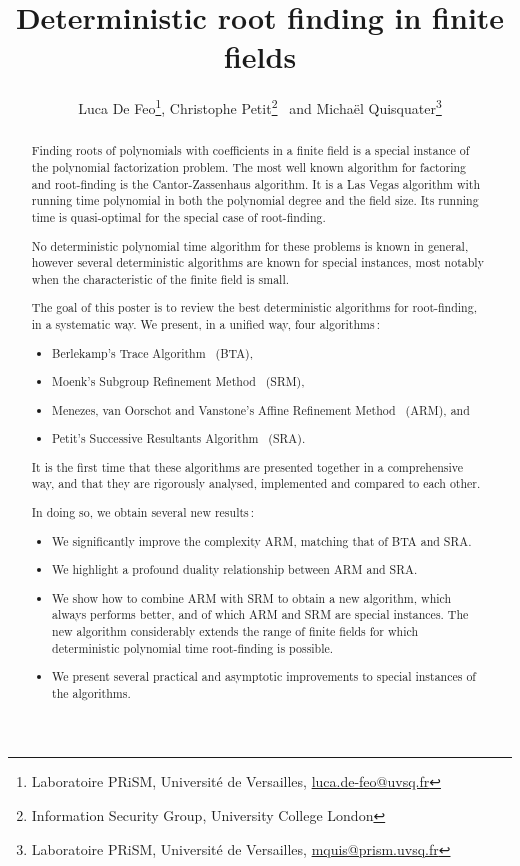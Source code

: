 \documentclass[11pt]{article}
\newcounter{algo}
\begin{document}
\title{Deterministic root finding in finite fields}

\author{
  Luca De Feo\footnote{
    Laboratoire PRiSM,
    Universit\'e de Versailles,
    \url{luca.de-feo@uvsq.fr}},
  Christophe Petit\footnote{
    Information Security Group,
    University College London}~ and
  Micha\"el Quisquater\footnote{
    Laboratoire PRiSM,
    Universit\'e de Versailles,
    \url{mquis@prism.uvsq.fr}}
}

\maketitle
\begin{abstract}
  Finding roots of polynomials with coefficients in a finite field is
  a special instance of the polynomial factorization problem. The most
  well known algorithm for factoring and root-finding is the
  Cantor-Zassenhaus algorithm. It is a Las Vegas algorithm with
  running time polynomial in both the polynomial degree and the field
  size. Its running time is quasi-optimal for the special case of
  root-finding.

  No deterministic polynomial time algorithm for these problems is
  known in general, however several deterministic algorithms are known
  for special instances, most notably when the characteristic of the
  finite field is small.

  The goal of this poster is to review the best deterministic
  algorithms for root-finding, in a systematic way.  We present, in a
  unified way, four algorithms :
  \begin{itemize}
  \item Berlekamp's Trace Algorithm~\cite{berl70} (BTA),
  \item Moenk's Subgroup Refinement Method~\cite{Moenck77} (SRM),
  \item Menezes, van Oorschot and Vanstone's Affine Refinement
    Method~\cite{MenezesOV88,OorschotV89} (ARM), and
  \item Petit's Successive Resultants Algorithm~\cite{cgUCL-P14}
    (SRA).
  \end{itemize}
  It is the first time that these algorithms are presented together in
  a comprehensive way, and that they are rigorously analysed,
  implemented and compared to each other.

  In doing so, we obtain several new results :
  \begin{itemize}
  \item We significantly improve the complexity ARM, matching that of
    BTA and SRA.
  \item We highlight a profound duality relationship between ARM and
    SRA.
  \item We show how to combine ARM with SRM to obtain a new algorithm,
    which always performs better, and of which ARM and SRM are special
    instances. The new algorithm considerably extends the range of
    finite fields for which deterministic polynomial time root-finding
    is possible.
  \item We present several practical and asymptotic improvements to
    special instances of the algorithms.
  \end{itemize}


\end{abstract}
\end{document}

